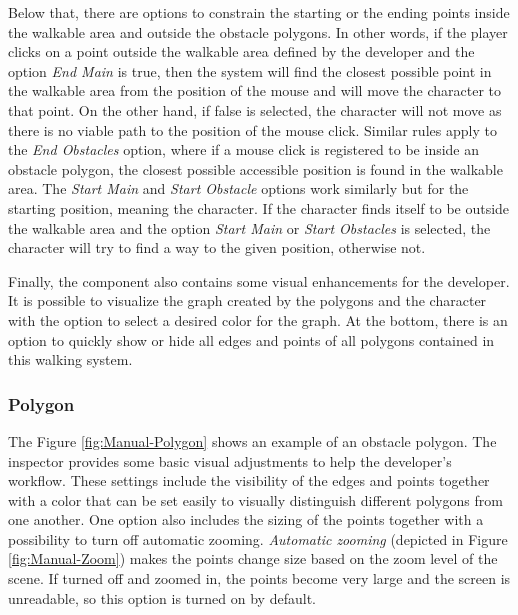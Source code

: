 Below that, there are options to constrain the starting or the ending points inside the walkable area and outside the obstacle polygons. In other words, if the player clicks on a point outside the walkable area defined by the developer and the option \textit{End Main} is true, then the system will find the closest possible point in the walkable area from the position of the mouse and will move the character to that point. On the other hand, if false is selected, the character will not move as there is no viable path to the position of the mouse click. Similar rules apply to the \textit{End Obstacles} option, where if a mouse click is registered to be inside an obstacle polygon, the closest possible accessible position is found in the walkable area. The \textit{Start Main} and \textit{Start Obstacle} options work similarly but for the starting position, meaning the character. If the character finds itself to be outside the walkable area and the option \textit{Start Main} or \textit{Start Obstacles} is selected, the character will try to find a way to the given position, otherwise not.

Finally, the component also contains some visual enhancements for the developer. It is possible to visualize the graph created by the polygons and the character with the option to select a desired color for the graph. At the bottom, there is an option to quickly show or hide all edges and points of all polygons contained in this walking system. 

\subsubsection{Polygon}
The Figure \ref{fig:Manual-Polygon} shows an example of an obstacle polygon. The inspector provides some basic visual adjustments to help the developer's workflow. These settings include the visibility of the edges and points together with a color that can be set easily to visually distinguish different polygons from one another. One option also includes the sizing of the points together with a possibility to turn off automatic zooming. \textit{Automatic zooming} (depicted in Figure \ref{fig:Manual-Zoom}) makes the points change size based on the zoom level of the scene. If turned off and zoomed in, the points become very large and the screen is unreadable, so this option is turned on by default.

